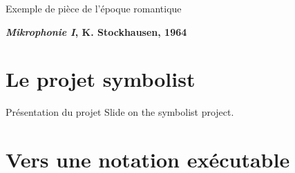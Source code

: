 \documentclass[pdf]{beamer}
\begin{document}
\begin{frame}{Exemple de pièce de l'époque romantique}
\begin{center}
\textbf{\textit{Mikrophonie I}, K. Stockhausen, 1964}\\
\end{center}
\end{frame}

\section[Symbolist]{Le projet symbolist}

\begin{frame}{Présentation du projet}
Slide on the symbolist project.
\end{frame}

\section[Notation exécutable]{Vers une notation exécutable}
\end{document}
